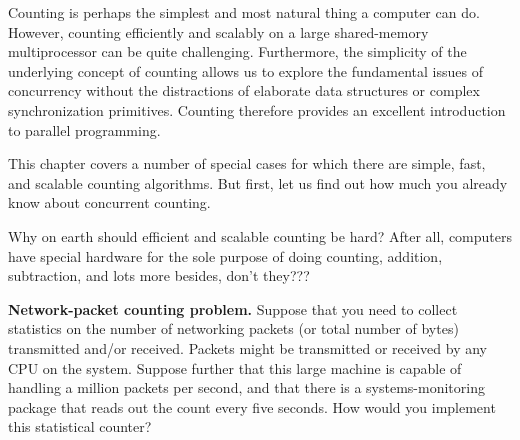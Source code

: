 

Counting is perhaps the simplest and most natural thing a computer can do.
However, counting efficiently and scalably on a large
shared-memory multiprocessor can be quite challenging.
Furthermore, the simplicity of the underlying concept of counting
allows us to explore the fundamental issues of concurrency without
the distractions
of elaborate data structures or complex synchronization primitives.
Counting therefore provides an excellent introduction to
parallel programming.

This chapter covers a number of special cases for which there are simple,
fast, and scalable counting algorithms.
But first, let us find out how much you already know about concurrent
counting.

\QuickQuiz{}
	Why on earth should efficient and scalable counting be hard?
	After all, computers have special hardware for the sole purpose
	of doing counting,
	addition, subtraction, and lots more besides, don't they???
 \QuickQuizEnd

\QuickQuiz{}
	{ \bfseries Network-packet counting problem. }
	Suppose that you need to collect statistics on the number
	of networking packets (or total number of bytes) transmitted
	and/or received.
	Packets might be transmitted or received by any CPU on
	the system.
	Suppose further that this large machine is capable of
	handling a million packets per second, and that there
	is a systems-monitoring package that reads out the count
	every five seconds.
	How would you implement this statistical counter?
 \QuickQuizEnd

